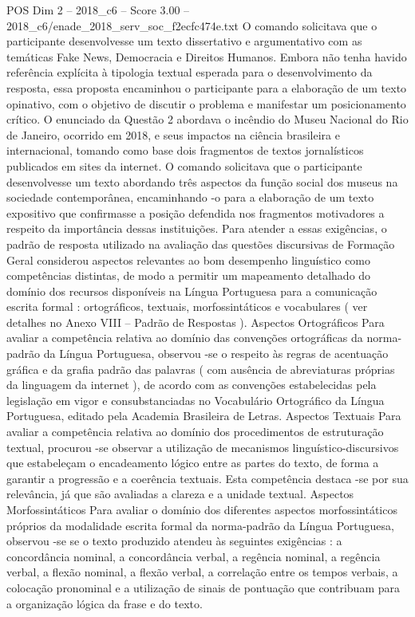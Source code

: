 \begin{textsample}{POS Dim 2 – 2018\_c6 – Score 3.00 – 2018\_c6/enade\_2018\_serv\_soc\_f2ecfc474e.txt}
O comando solicitava que o participante desenvolvesse um texto dissertativo e argumentativo com as temáticas Fake News, Democracia e Direitos Humanos.
Embora não tenha havido referência explícita à tipologia textual esperada para o desenvolvimento da resposta, essa proposta encaminhou o participante para a elaboração de um texto opinativo, com o objetivo de discutir o problema e manifestar um posicionamento crítico.
O enunciado da Questão 2 abordava o incêndio do Museu Nacional do Rio de Janeiro, ocorrido em 2018, e seus impactos na ciência brasileira e internacional, tomando como base dois fragmentos de textos jornalísticos publicados em sites da internet.
O comando solicitava que o participante desenvolvesse um texto abordando três aspectos da função social dos museus na sociedade contemporânea, encaminhando -o para a elaboração de um texto expositivo que confirmasse a posição defendida nos fragmentos motivadores a respeito da importância dessas instituições.
Para atender a essas exigências, o padrão de resposta utilizado na avaliação das questões discursivas de Formação Geral considerou aspectos relevantes ao bom desempenho linguístico como competências distintas, de modo a permitir um mapeamento detalhado do domínio dos recursos disponíveis na Língua Portuguesa para a comunicação escrita formal : ortográficos, textuais, morfossintáticos e vocabulares ( ver detalhes no Anexo VIII – Padrão de Respostas ).
Aspectos Ortográficos Para avaliar a competência relativa ao domínio das convenções ortográficas da norma-padrão da Língua Portuguesa, observou -se o respeito às regras de acentuação gráfica e da grafia padrão das palavras ( com ausência de abreviaturas próprias da linguagem da internet ), de acordo com as convenções estabelecidas pela legislação em vigor e consubstanciadas no Vocabulário Ortográfico da Língua Portuguesa, editado pela Academia Brasileira de Letras.
Aspectos Textuais Para avaliar a competência relativa ao domínio dos procedimentos de estruturação textual, procurou -se observar a utilização de mecanismos linguístico-discursivos que estabeleçam o encadeamento lógico entre as partes do texto, de forma a garantir a progressão e a coerência textuais.
Esta competência destaca -se por sua relevância, já que são avaliadas a clareza e a unidade textual.
Aspectos Morfossintáticos Para avaliar o domínio dos diferentes aspectos morfossintáticos próprios da modalidade escrita formal da norma-padrão da Língua Portuguesa, observou -se se o texto produzido atendeu às seguintes exigências : a concordância nominal, a concordância verbal, a regência nominal, a regência verbal, a flexão nominal, a flexão verbal, a correlação entre os tempos verbais, a colocação pronominal e a utilização de sinais de pontuação que contribuam para a organização lógica da frase e do texto.

\end{textsample}
